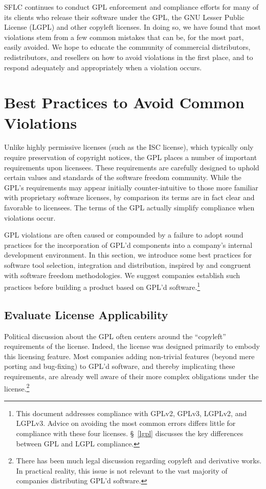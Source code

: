 SFLC continues to conduct GPL enforcement and compliance efforts for many
of its clients who release their software under the GPL, the GNU Lesser
Public License (LGPL) and other copyleft licenses.  In doing so, we have
found that most violations stem from a few common mistakes that can be,
for the most part, easily avoided.  We hope to educate the community of
commercial distributors, redistributors, and resellers on how to avoid
violations in the first place, and to respond adequately and appropriately
when a violation occurs.

\chapter{Best Practices to Avoid Common Violations}
\label{best-practices}

Unlike highly permissive licenses (such as the ISC license), which
typically only require preservation of copyright notices, the GPL places a
number of important requirements upon licensees.  These requirements are
carefully designed to uphold certain values and standards of the software
freedom community.  While the GPL's requirements may appear initially
counter-intuitive to those more familiar with proprietary software
licenses, by comparison its terms are in fact clear and favorable to
licensees.  The terms of the GPL actually simplify compliance when
violations occur.

GPL violations are often caused or compounded by a failure to adopt sound
practices for the incorporation of GPL'd components into a company's
internal development environment.  In this section, we introduce some best
practices for software tool selection, integration and distribution,
inspired by and congruent with software freedom methodologies.  We suggest companies
establish such practices before building a product based on GPL'd
software.\footnote{This document addresses compliance with GPLv2,
  GPLv3, LGPLv2, and LGPLv3.  Advice on avoiding the most common
  errors differs little for compliance with these four licenses.
  \S~\ref{lgpl} discusses the key differences between GPL and LGPL
  compliance.}

\section{Evaluate License Applicability}
\label{derivative-works}
Political discussion about the GPL often centers around the ``copyleft''
requirements of the license.  Indeed, the license was designed primarily
to embody this licensing feature.  Most companies adding non-trivial
features (beyond mere porting and bug-fixing) to GPL'd software, and
thereby implicating these requirements, are already well aware of their
more complex obligations under the license.\footnote{There has been much legal
  discussion regarding copyleft and derivative works.  In practical
  reality, this issue is not relevant to the vast majority of companies
  distributing GPL'd software.}

